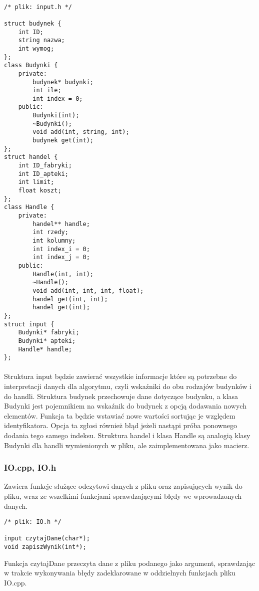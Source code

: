 \documentclass{article}
\begin{document}
\paragraph{}

\begin{lstlisting}
/* plik: input.h */

struct budynek {
	int ID;
	string nazwa;
	int wymog;
};
class Budynki {
	private:
		budynek* budynki;
		int ile;
		int index = 0;
	public:
		Budynki(int);
		~Budynki();
		void add(int, string, int);
		budynek get(int);
};
struct handel {
	int ID_fabryki;
	int ID_apteki;
	int limit;
	float koszt;
};
class Handle {
	private:
		handel** handle;
		int rzedy;
		int kolumny;
		int index_i = 0;
		int index_j = 0;
	public:
		Handle(int, int);
		~Handle();
		void add(int, int, int, float);
		handel get(int, int);
		handel get(int);
};
struct input {
	Budynki* fabryki;
	Budynki* apteki;
	Handle* handle;
};
\end{lstlisting}

\paragraph{}

Struktura input będzie zawierać wszystkie informacje które są potrzebne do interpretacji danych dla algorytmu, czyli wskaźniki do obu rodzajów budynków i do handli. Struktura budynek przechowuje dane dotyczące budynku, a klasa Budynki jest pojemnikiem na wskaźnik do budynek z opcją dodawania nowych elementów. Funkcja ta będzie wstawiać nowe wartości sortując je względem identyfikatora. Opcja ta zgłosi również błąd jeżeli nastąpi próba ponownego dodania tego samego indeksu. Struktura handel i klasa Handle są analogią klasy Budynki dla handli wymienionych w pliku, ale zaimplementowana jako macierz.

\subsubsection{IO.cpp, IO.h}

Zawiera funkcje służące odczytowi danych z pliku oraz zapisujących wynik do pliku, wraz ze wszelkimi funkcjami sprawdzającymi błędy we wprowadzonych danych.

\begin{lstlisting}
/* plik: IO.h */

input czytajDane(char*);
void zapiszWynik(int*);
\end{lstlisting}

Funkcja czytajDane przeczyta dane z pliku podanego jako argument, sprawdzając w trakcie wykonywania błędy zadeklarowane w oddzielnych funkcjach pliku IO.cpp.
\end{document}
